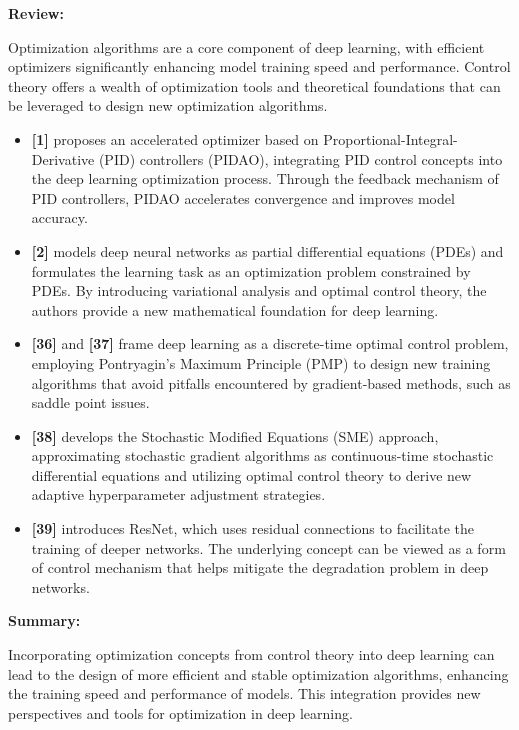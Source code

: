 \documentclass{article}
\theoremstyle{plain}
\theoremstyle{definition}
\theoremstyle{remark}
\begin{document}
\textbf{Review:}

Optimization algorithms are a core component of deep learning, with efficient optimizers significantly enhancing model training speed and performance. Control theory offers a wealth of optimization tools and theoretical foundations that can be leveraged to design new optimization algorithms.

\begin{itemize}
    \item \textbf{[1]} proposes an accelerated optimizer based on Proportional-Integral-Derivative (PID) controllers (PIDAO), integrating PID control concepts into the deep learning optimization process. Through the feedback mechanism of PID controllers, PIDAO accelerates convergence and improves model accuracy.
    
    \item \textbf{[2]} models deep neural networks as partial differential equations (PDEs) and formulates the learning task as an optimization problem constrained by PDEs. By introducing variational analysis and optimal control theory, the authors provide a new mathematical foundation for deep learning.
    
    \item \textbf{[36]} and \textbf{[37]} frame deep learning as a discrete-time optimal control problem, employing Pontryagin's Maximum Principle (PMP) to design new training algorithms that avoid pitfalls encountered by gradient-based methods, such as saddle point issues.
    
    \item \textbf{[38]} develops the Stochastic Modified Equations (SME) approach, approximating stochastic gradient algorithms as continuous-time stochastic differential equations and utilizing optimal control theory to derive new adaptive hyperparameter adjustment strategies.
    
    \item \textbf{[39]} introduces ResNet, which uses residual connections to facilitate the training of deeper networks. The underlying concept can be viewed as a form of control mechanism that helps mitigate the degradation problem in deep networks.
\end{itemize}

\textbf{Summary:}

Incorporating optimization concepts from control theory into deep learning can lead to the design of more efficient and stable optimization algorithms, enhancing the training speed and performance of models. This integration provides new perspectives and tools for optimization in deep learning.
\end{document}
